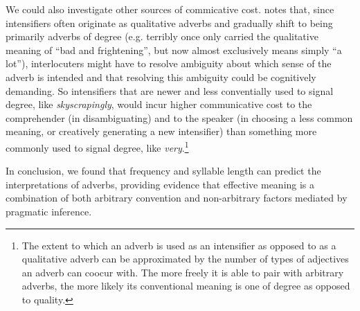 \documentclass[10pt,letterpaper]{article}
\newcommand{\w}[1]{\emph{#1}}
\begin{document}
We could also investigate other sources of commicative cost. \cite{peters} %
notes that, since intensifiers often originate as qualitative adverbs and gradually shift to being primarily adverbs of degree (e.g. terribly once only carried the qualitative meaning of ``bad and frightening'', but now almost exclusively means simply ``a lot''), interlocuters might have to resolve ambiguity about which sense of the adverb is intended and that resolving this ambiguity could be cognitively demanding. So intensifiers that are newer and less conventially used to signal degree, like \w{skyscrapingly}, would incur higher communicative cost to the comprehender (in disambiguating) and to the speaker (in choosing a less common meaning, or creatively generating a new intensifier) than something more commonly used to signal degree, like \w{very}.\footnote{The extent to which an adverb is used as an intensifier as opposed to as a qualitative adverb can be approximated by the number of types of adjectives an adverb can coocur with. The more freely it is able to pair with arbitrary adverbs, the more likely its conventional meaning is one of degree as opposed to quality.}






In conclusion, we found that frequency and syllable length can predict the interpretations of adverbs, %
providing evidence that effective meaning is a combination of both arbitrary convention and non-arbitrary factors mediated by pragmatic inference.
\end{document}
